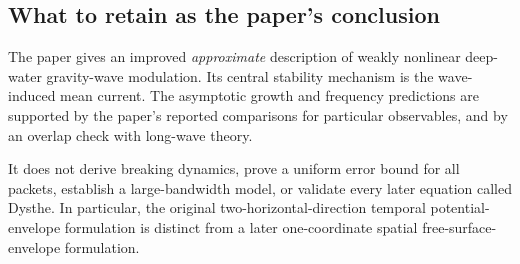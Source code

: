 \subsection{What to retain as the paper's conclusion}
The paper gives an improved \emph{approximate} description of weakly
nonlinear deep-water gravity-wave modulation. Its central stability
mechanism is the wave-induced mean current. The asymptotic growth and
frequency predictions are supported by the paper's reported comparisons
for particular observables, and by an overlap check with long-wave theory.

It does not derive breaking dynamics, prove a uniform error bound for all
packets, establish a large-bandwidth model, or validate every later
equation called Dysthe. In particular, the original two-horizontal-direction
temporal potential-envelope formulation is distinct from a later
one-coordinate spatial free-surface-envelope formulation.

\clearpage
